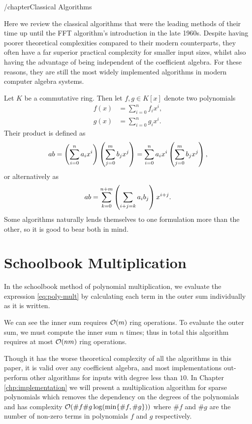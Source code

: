 /chapter{Classical Algorithms}\label{chp:classical}

Here we review the classical algorithms that were the leading methods of their time up until the FFT algorithm's introduction in the late 1960s. Despite having poorer theoretical complexities compared to their modern counterparts, they often have a far superior practical complexity for smaller input sizes, whilst also having the advantage of being independent of the coefficient algebra. For these reasons, they are still the most widely implemented algorithms in modern computer algebra systems.

Let $K$ be a commutative ring. Then let $f, g \in K[x]$ denote two polynomials
\begin{align*}
    f(x) &= \sum^n_{i=0} f_ix^i,\\
    g(x) &= \sum^n_{i=0} g_ix^i.
\end{align*}
Their product is defined as
\begin{equation}\label{eq:poly-mult}
    ab = \left(\sum^n_{i=0} a_i x^i\right)\left(\sum^m_{j=0} b_j x^j\right) = \sum^n_{i=0} a_ix^i\left(\sum^m_{j=0} b_j x^j\right),
\end{equation}
or alternatively as
\begin{equation}\label{eq:poly-mult-conv}
    ab = \sum^{n + m}_{k=0} \left(\sum_{i + j = k}a_ib_j\right) x^{i + j}.
\end{equation}
Some algorithms naturally lends themselves to one formulation more than the other, so it is good to bear both in mind.

\section{Schoolbook Multiplication}
\label{sec:prelim-schoolbook}

In the schoolbook method of polynomial multiplication, we evaluate the expression \eqref{eq:poly-mult} by calculating each term in the outer sum individually as it is written.

We can see the inner sum requires $\mathcal O(m)$ ring operations. To evaluate the outer sum, we must compute the inner sum $n$ times; thus in total this algorithm requires at most $\mathcal O(nm)$ ring operations.

Though it has the worse theoretical complexity of all the algorithms in this paper, it is valid over any coefficient algebra, and most implementations out-perform other algorithms for inputs with degree less than $10$. In Chapter \ref{chp:implementation} we will present a multiplication algorithm for sparse polynomials which removes the dependency on the degrees of the polynomials and has complexity $\mathcal O(\# f \# g \log(\min\{\# f, \# g\}))$ where $\# f$ and $\# g$ are the number of non-zero terms in polynomials $f$ and $g$ respectively.

